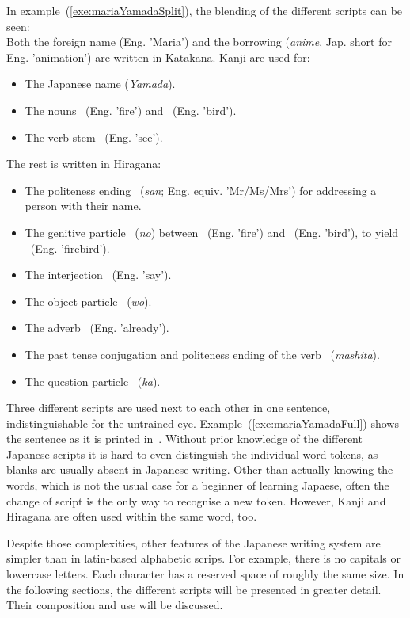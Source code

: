 In example~(\ref{exe:mariaYamadaSplit}), the blending of the different scripts 
can be seen:\\
Both the foreign name   (Eng. 'Maria') and the borrowing 
 (\emph{anime}, Jap. short for Eng. 'animation') are written in 
Katakana. Kanji are used for:
\begin{itemize}
\item The Japanese name  (\emph{Yamada}).
\item The nouns ~(Eng. 'fire') and 
      ~(Eng. 'bird').
\item The verb stem ~(Eng. 'see').
\end{itemize}
The rest is written in Hiragana:
\begin{itemize}
  \item The politeness ending ~(\emph{san}; 
        Eng. equiv. 'Mr/Ms/Mrs') for addressing a person with their name.
  \item The genitive particle ~(\emph{no}) between 
        ~(Eng. 'fire') and ~(Eng. 'bird'), to yield 
        ~(Eng. 'firebird').
  \item The interjection ~(Eng. 'say').
  \item The object particle ~(\emph{wo}).
  \item The adverb ~(Eng. 'already').
  \item The past tense conjugation and politeness ending of the 
        verb ~(\emph{mashita}).
  \item The question particle ~(\emph{ka}).
\end{itemize}

Three different scripts are used next to each other in one sentence,
indistinguishable for the untrained eye. Example~(\ref{exe:mariaYamadaFull}) 
shows the sentence as it is printed in~. Without prior
knowledge of the different Japanese scripts it is hard to even distinguish
the individual word tokens, as blanks are usually absent in Japanese writing.
Other than actually knowing the words, which is not the usual case for a 
beginner of learning Japaese, often the change of script is the only way to 
recognise a new token. However, Kanji and Hiragana are often used within the same
word, too.

Despite those complexities, other features of the Japanese writing system are 
simpler than in latin-based alphabetic scrips. 
For example, there is no capitals or lowercase letters.
Each character has a reserved space of roughly the same size.
In the following sections, the different scripts will be presented in greater 
detail. Their composition and use will be discussed.

